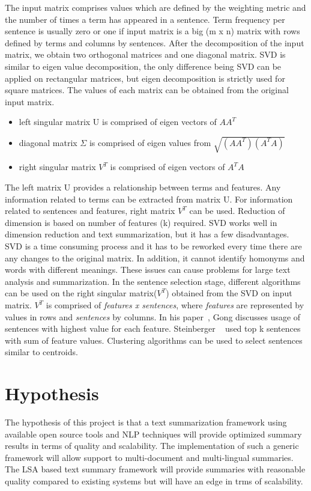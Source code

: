 The input matrix comprises values which are defined by the weighting metric and the number of times a term has appeared in a sentence.
Term frequency per sentence is usually zero or one if input matrix is a big (m x n) matrix with rows
defined by terms and columns by sentences. After the decomposition of the input matrix, we obtain two orthogonal matrices and
one diagonal matrix. SVD is similar to eigen value decomposition, the only difference being SVD can be applied on rectangular 
matrices, but eigen decomposition is strictly used for square matrices.\newline
The values of each matrix can be obtained from the original input matrix.
\begin{itemize}
\item left singular matrix U is comprised of eigen vectors of $A A^T$
\item diagonal matrix $\Sigma$ is comprised of eigen values from $\sqrt{(A A^T) (A^T A)}$
\item right singular matrix $V^T$ is comprised of eigen vectors of $A^T A$
\end{itemize}
The left matrix U provides a relationship between terms and features. Any information related to terms can be extracted from matrix U.
For information related to sentences and features, right matrix $V^T$ can be used. Reduction of dimension is based on number
of features (k) required. SVD works well in dimension reduction and text summarization, but it has a few disadvantages. SVD is a time consuming process
and it has to be reworked every time there are any changes to the original matrix. In addition, it cannot identify homonyms and words with
different meanings. These issues can cause problems for large text analysis and summarization.\newline
In the sentence selection stage, different algorithms can be used on the right singular matrix($V^T$) obtained from the SVD on input
matrix. $V^T$ is comprised of \textit{features x sentences}, where \textit{features} are represented by values in rows and \textit{sentences}
by columns. In his paper~\cite{Gong-Liu},  Gong discusses usage of sentences with highest value for each feature. Steinberger \etal
~\cite{Steinberger:2009} used top k sentences with sum of feature values. Clustering algorithms can be used to select sentences
similar to centroids.

\section{Hypothesis}
The hypothesis of this project is that a text summarization framework using available open source tools and NLP techniques
will provide optimized summary results in terms of quality and scalability. The implementation of such a generic framework will
allow support to multi-document and multi-lingual summaries. The LSA based text summary framework will provide summaries with
reasonable quality compared to existing systems but will have an edge in trms of scalability.
